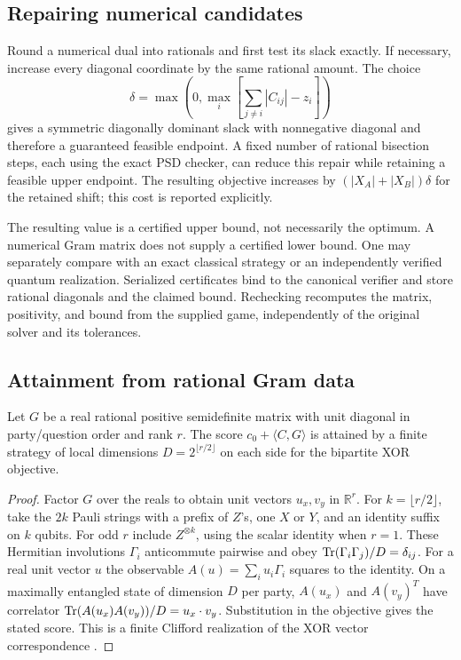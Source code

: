 \subsection{Repairing numerical candidates}
Round a numerical dual into rationals and first test its slack exactly. If
necessary, increase every diagonal coordinate by the same rational amount.
The choice
\[
 \delta=\max\left(0,\max_i\left[\sum_{j\ne i}|C_{ij}|-z_i\right]\right)
\]
gives a symmetric diagonally dominant slack with nonnegative diagonal and
therefore a guaranteed feasible endpoint. A fixed number of rational bisection
steps, each using the exact PSD checker, can reduce this repair while retaining
a feasible upper endpoint. The resulting objective increases by
$(|X_A|+|X_B|)\delta$ for the retained shift; this cost is reported explicitly.

The resulting value is a certified upper bound, not necessarily the optimum.
A numerical Gram matrix does not supply a certified lower bound. One may
separately compare with an exact classical strategy or an independently verified
quantum realization. Serialized certificates bind to the canonical verifier
and store rational diagonals and the claimed bound. Rechecking recomputes the
matrix, positivity, and bound from the supplied game, independently of the
original solver and its tolerances.

\subsection{Attainment from rational Gram data}

\begin{proposition}
Let $G$ be a real rational positive semidefinite matrix with unit diagonal
in party/question order and rank $r$. The score $c_0+\langle C,G\rangle$ is
attained by a finite strategy of local dimensions $D=2^{\lfloor r/2\rfloor}$
on each side for the bipartite XOR objective.
\end{proposition}
\begin{proof}
Factor $G$ over the reals to obtain unit vectors $u_x,v_y$ in $\mathbb R^r$.
For $k=\lfloor r/2\rfloor$, take the $2k$ Pauli strings with a prefix of $Z$'s,
one $X$ or $Y$, and an identity suffix on $k$ qubits. For odd $r$ include
$Z^{\otimes k}$, using the scalar identity when $r=1$. These Hermitian
involutions $\Gamma_i$ anticommute pairwise and obey
$\operatorname{Tr}(\Gamma_i\Gamma_j)/D=\delta_{ij}$. For a real unit vector $u$ the
observable $A(u)=\sum_i u_i\Gamma_i$ squares to the identity. On a maximally
entangled state of dimension $D$ per party, $A(u_x)$ and $A(v_y)^T$ have
correlator $\operatorname{Tr}(A(u_x)A(v_y))/D=u_x\cdot v_y$. Substitution in the objective
gives the stated score. This is a finite Clifford realization of the XOR
vector correspondence \cite{cleve2004}.
\end{proof}

